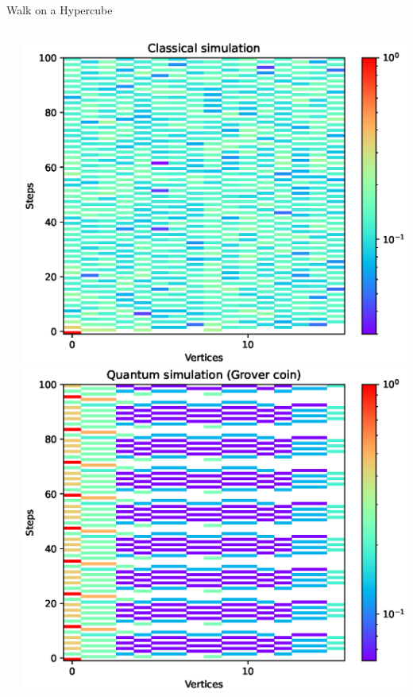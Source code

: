 \documentclass[aspectratio=169]{beamer}
\begin{document}
\begin{frame}{Walk on a Hypercube}
  \begin{columns}[onlytextwidth]
    \begin{column}{.20\textwidth}
    \end{column}
    \begin{column}{.30\textwidth}
      \includegraphics[width=\textwidth]{./figures/results/hypercube/classical.eps}
      \vspace{-1em} %
      \includegraphics[width=\textwidth]{./figures/results/hypercube/grover.eps}

\end{column}
\end{columns}
\end{frame}
\end{document}
